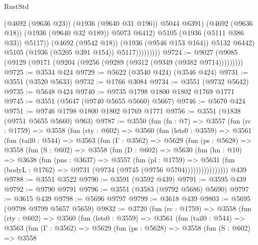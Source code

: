 \begin{lexlean}{RustStd}
\begin{coremodule}
                                (@4692 (@9636 @23))
                                (@1936 (@9640 @31 @196))
                                @5044
                                @6391)
                              (@4692 (@9636 @18))
                              (@1936 (@9640 @32 @189))
                              @5073
                              @6412)
                            @5105
                            (@1936 (@5111 @386 @33))
                            @5117))
                        (@4692 (@9542 @18))
                        (@1936 (@9546 @153 @164))
                        @5132
                        @6442)
                      @5105
                      (@1936 (@5205 @391 @154))
                      @5117)))))))))
@9724 := @9027 (@9085 (@9129 (@9171 (@9204 (@9256 (@9289 (@9312 (@9349 (@9382 @9714)))))))))
@9725 := @3534 @424
@9729 := @5622 (@3540 @424) (@3546 @424)
@9731 := @3551 (@3520 @5633)
@9732 := @1766 @3084
@9734 := @3551 (@9732 @5642)
@9735 := @5648 @424
@9740 := @9735 @1798 @1800 @1802 @1769 @1771
@9745 := @3551 (@5647 (@9740 @5655 @5660) @5667)
@9746 := @5670 @424
@9751 := @9746 @1798 @1800 @1802 @1769 @1771
@9756 := @3551 (@1838 (@9751 @5655 @5660) @963)
@9787 := @3550
    (fun (fn : @7) =>
    @3557
      (fun (rc : @1759) =>
      @3558
        (fun (rty : @602) =>
        @3560
          (fun (lets0 : @3559) =>
          @3561
            (fun (tail0 : @544) =>
            @3563
              (fun (Γ : @3562) =>
              @5629
                (fun (ps : @5628) =>
                @3558
                  (fun (S : @602) =>
                  @3558
                    (fun (D : @602) =>
                    @5630
                      (fun (hn : @10) =>
                      @3638
                        (fun (pns : @3637) =>
                        @3557
                          (fun (pl : @1759) =>
                          @5631
                            (fun (bodyL : @1762) => @9731 (@9734 (@9745 (@9756 @5704))))))))))))))))
    @439
@9788 := @3551 @3522
@9790 := @3591 (@3592 @439)
@9791 := @3595 @439
@9792 := @9790 @9791
@9796 := @3551 (@3583 (@9792 @5686) @5690)
@9797 := @3615 @439
@9798 := @5696 @9797
@9799 := @3618 @439
@9803 := @5695 (@9798 @9799 @5657 @5659)
@9832 := @3720
    (fun (rc : @1759) =>
    @3558
      (fun (rty : @602) =>
      @3560
        (fun (lets0 : @3559) =>
        @3561
          (fun (tail0 : @544) =>
          @3563
            (fun (Γ : @3562) =>
            @5629
              (fun (ps : @5628) =>
              @3558
                (fun (S : @602) =>
                @3558

\end{coremodule}
\end{lexlean}
